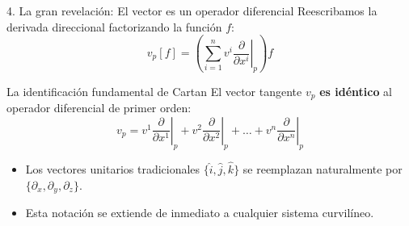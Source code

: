 \documentclass[10pt,aspectratio=169]{beamer}
\begin{document}
\begin{frame}{4. La gran revelación: El vector es un operador diferencial}
  Reescribamos la derivada direccional factorizando la función $f$:
  \[
  v_p[f] = \left( \sum_{i=1}^n v^i \left.\frac{\partial}{\partial x^i}\right|_p \right) f
  \]
  \vspace{-0.2cm}
  \begin{alertblock}{La identificación fundamental de Cartan}
    El vector tangente $v_p$ \textbf{es idéntico} al operador diferencial de primer orden:
    \[
    v_p = v^1 \left.\frac{\partial}{\partial x^1}\right|_p + v^2 \left.\frac{\partial}{\partial x^2}\right|_p + \dots + v^n \left.\frac{\partial}{\partial x^n}\right|_p
    \]
  \end{alertblock}
  \vspace{0.2cm}
  \begin{itemize}
    \item Los vectores unitarios tradicionales $\{\hat{i}, \hat{j}, \hat{k}\}$ se reemplazan naturalmente por $\{\partial_x, \partial_y, \partial_z\}$.
    \item Esta notación se extiende de inmediato a cualquier sistema curvilíneo.
  \end{itemize}
\end{frame}
\end{document}
